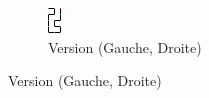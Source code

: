 \documentclass[twoside, a4paper, 12pt]{report}
\begin{document}
\begin{figure}[h]
\begin{center}
\begin{subfigure}[b]{0.1\textwidth}
   \includegraphics[width=1\linewidth, scale=1]{3_5_pb_3n_v1.png}
   \caption{Version (Gauche, Droite)}
\end{subfigure} \hspace{5cm}%

\end{center}
\end{figure}
\end{document}
